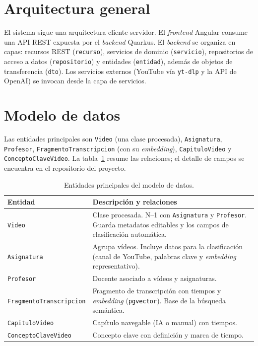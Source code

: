 
\section{Arquitectura general}

El sistema sigue una arquitectura cliente-servidor. El \textit{frontend} Angular consume una API
REST expuesta por el \textit{backend} Quarkus. El \textit{backend} se organiza en capas:
recursos REST (\texttt{recurso}), servicios de dominio (\texttt{servicio}), repositorios de
acceso a datos (\texttt{repositorio}) y entidades (\texttt{entidad}), además de objetos de
transferencia (\texttt{dto}). Los servicios externos (YouTube vía \texttt{yt-dlp} y la API de
OpenAI) se invocan desde la capa de servicios.

\section{Modelo de datos}

Las entidades principales son \texttt{Video} (una clase procesada), \texttt{Asignatura},
\texttt{Profesor}, \texttt{FragmentoTranscripcion} (con su \textit{embedding}),
\texttt{CapituloVideo} y \texttt{ConceptoClaveVideo}. La tabla~\ref{tab:entidades} resume las
relaciones; el detalle de campos se encuentra en el repositorio del proyecto.

\begin{table}[H]
  \centering
  \caption{Entidades principales del modelo de datos.}
  \label{tab:entidades}
  \begin{tabular}{p{3.2cm}p{9cm}}
    \toprule
    \textbf{Entidad} & \textbf{Descripción y relaciones} \\
    \midrule
    \texttt{Video} & Clase procesada. N--1 con \texttt{Asignatura} y \texttt{Profesor}. Guarda
      metadatos editables y los campos de clasificación automática. \\
    \texttt{Asignatura} & Agrupa vídeos. Incluye datos para la clasificación (canal de YouTube,
      palabras clave y \textit{embedding} representativo). \\
    \texttt{Profesor} & Docente asociado a vídeos y asignaturas. \\
    \texttt{FragmentoTranscripcion} & Fragmento de transcripción con tiempos y \textit{embedding}
      (\texttt{pgvector}). Base de la búsqueda semántica. \\
    \texttt{CapituloVideo} & Capítulo navegable (IA o manual) con tiempos. \\
    \texttt{ConceptoClaveVideo} & Concepto clave con definición y marca de tiempo. \\
    \bottomrule
  \end{tabular}
\end{table}

